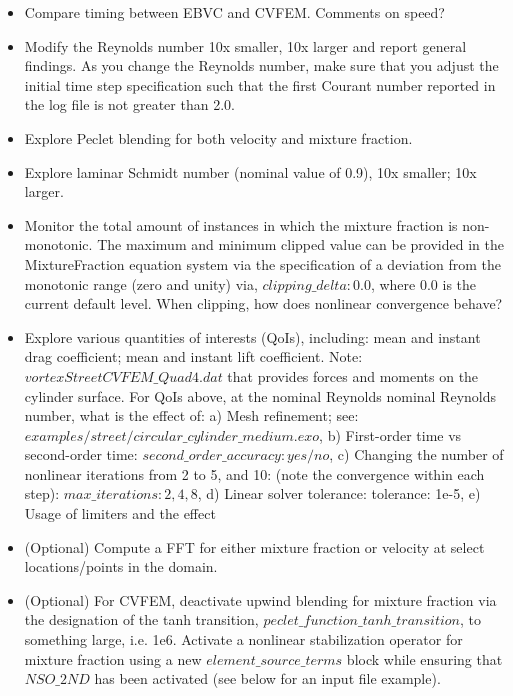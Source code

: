 \documentclass{article}
\begin{document}
\begin{itemize}
	\item Compare timing between EBVC and CVFEM. Comments on speed?
        \item Modify the Reynolds number 10x smaller, 10x larger and report general findings. 
          As you change the Reynolds number, make sure that you adjust the initial time step 
          specification such that the first Courant number reported in the log file is not greater 
          than 2.0.
        \item Explore Peclet blending for both velocity and mixture fraction.
        \item Explore laminar Schmidt number (nominal value of 0.9), 10x smaller; 10x larger.
        \item Monitor the total amount of instances in which the mixture fraction is non-monotonic.
          \subitem The maximum and minimum clipped value can be provided in the MixtureFraction
          equation system via the specification of a deviation from the monotonic range (zero and unity)
          via, $clipping\_delta: 0.0$, where $0.0$ is the current default level. When clipping, how does nonlinear 
          convergence behave?
        \item Explore various quantities of interests (QoIs), including: mean and instant drag 
          coefficient; mean and instant lift coefficient. 
        \subitem Note: $vortexStreetCVFEM\_Quad4.dat$ 
          that provides forces and moments on the cylinder surface. For QoIs above, at the nominal 
          Reynolds nominal Reynolds number, what is the effect of: a) Mesh refinement; see: 
          $examples/street/circular\_cylinder\_medium.exo$, b) First-order time vs second-order time: 
          $second\_order\_accuracy: yes/no$, c) Changing the number of nonlinear iterations from 2 to 5, 
          and 10: (note the convergence within each step): $max\_iterations: 2, 4, 8$, d) Linear solver 
          tolerance: tolerance: 1e-5, e) Usage of limiters and the effect
        \item (Optional) Compute a FFT for either mixture fraction or velocity at select locations/points in the domain. 
        \item (Optional) For CVFEM, deactivate upwind blending for mixture fraction via 
          the designation of the tanh transition,
          $peclet\_function\_tanh\_transition$, to something large, i.e. 1e6. Activate a nonlinear stabilization 
          operator for mixture fraction using a new $element\_source\_terms$ block while ensuring that $NSO\_2ND$ has 
          been activated (see below for an input file example).
\end{itemize}
\end{document}
